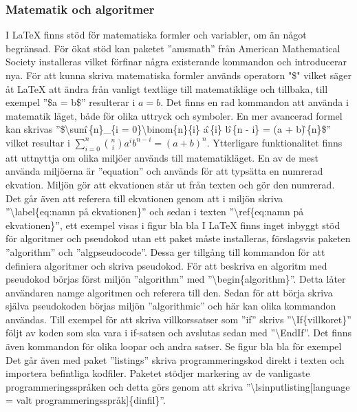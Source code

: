 \subsubsection{Matematik och algoritmer}
I {\LaTeX} finns stöd för matematiska formler och variabler, om än något begränsad. För ökat stöd kan paketet ''amsmath'' från American Mathematical Society installeras vilket förfinar några existerande kommandon och introducerar nya. För att kunna skriva matematiska formler används operatorn "\$" \hspace{0.2mm} vilket säger åt {\LaTeX} att ändra från vanligt textläge till matematikläge och tillbaka, till exempel ''\$a = b\$'' resulterar i $a = b$. Det finns en rad kommandon att använda i matematik läget, både för olika uttryck och symboler. En mer avancerad formel kan skrivas ''\$\textbackslash sum\^ \,\{n\}\_\{i = 0\}\textbackslash binom\{n\}\{i\} a\^ \,\{i\} b\^ \,\{n - i\} = (a + b)\^ \,\{n\}\$'' vilket resultar i $\sum^{n}_{i=0}\binom{n}{i}a^{i}b^{n-i} = (a + b)^{n}$. 
\newline
\newline
Ytterligare funktionalitet finns att uttnyttja om olika miljöer används till matematikläget. En av de mest använda miljöerna är ''equation'' och används för att typsätta en numrerad ekvation. Miljön gör att ekvationen står ut från texten och gör den numrerad. Det går även att referera till ekvationen genom att i miljön skriva ''\textbackslash label\{eq:namn på ekvationen\}'' och sedan i texten ''\textbackslash ref\{eq:namn på ekvationen\}'', ett exempel visas i figur bla bla        
\newline
\newline
I {\LaTeX} finns inget inbyggt stöd för algoritmer och pseudokod utan ett paket måste installeras, förslagsvis paketen ''algorithm'' och ''algpseudocode''. Dessa ger tillgång till kommandon för att definiera algoritmer och skriva pseudokod. För att beskriva en algoritm med pseudokod börjas först miljön ''algorithm'' med ''\textbackslash begin\{algorithm\}''. Detta låter användaren namge algoritmen och referera till den. Sedan för att börja skriva själva pseudokoden börjas miljön ''algorithmic'' och här kan olika kommandon användas. Till exempel för att skriva villkorssatser som ''if'' skrivs ''\textbackslash If\{villkoret\}'' följt av koden som ska vara i if-satsen och avslutas sedan med ''\textbackslash EndIf''. Det finns även kommandon för olika loopar och andra satser. Se figur bla bla för exempel 
\newline
\newline
Det går även med paket ''listings'' skriva programmeringskod direkt i texten och importera befintliga kodfiler. Paketet stödjer markering av de vanligaste programmeringsspråken och detta görs genom att skriva ''\textbackslash lsinputlisting[language = valt programmeringsspråk]\{dinfil\}''.  
